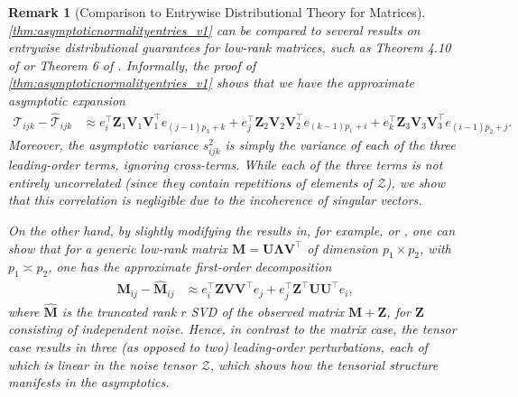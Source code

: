 \documentclass[10pt]{article}
\newcommand{\0}{{\mathbf{0}}}
\newcommand{\1}{{\mathbf{1}}}
\newcommand{\U}{{\mathbf{U}}}
\renewcommand{\citet}{\cite}
\renewcommand{\t}{^{\top}}
\newtheorem{remark}{Remark}
\renewcommand{\hat}{\widehat}
\renewcommand{\hat}{\widehat}
\begin{document}
\begin{remark}[Comparison to Entrywise Distributional  Theory for Matrices]
\cref{thm:asymptoticnormalityentries_v1} can be compared to several results on entrywise distributional guarantees for low-rank matrices, such as Theorem 4.10 of \citet{chen_spectral_2021} or Theorem 6 of \citet{yan_inference_2021}. %
Informally, the proof of \cref{thm:asymptoticnormalityentries_v1} shows that we have the approximate asymptotic expansion
\begin{align*}
    \mathcal{T}_{ijk} - \mathcal{\hat T}_{ijk} &\approx e_{i}^{\top} \mathbf{Z}_{1} \mathbf{V}_{1} \mathbf{V}_{1}^{\top} e_{(j-1) p_{3}+k}+e_{j}^{\top} \mathbf{Z}_{2} \mathbf{V}_{2} \mathbf{V}_{2}^{\top} e_{(k-1) p_{1}+i}+e_{k}^{\top} \mathbf{Z}_{3} \mathbf{V}_{3} \mathbf{V}_{3}^{\top} e_{(i-1) p_{2}+j}.
\end{align*}
Moreover, the asymptotic variance $s^2_{ijk}$ is simply the variance of each of the three leading-order terms, ignoring cross-terms.  While each of the three terms is not entirely uncorrelated (since they contain repetitions of elements of $\mathcal{Z}$), we show that this correlation is negligible due to the incoherence of singular vectors.  

On the other hand, by slightly modifying the results in, for example, \citet{chen_spectral_2021} or \citet{yan_inference_2021}, one can show that for a generic low-rank matrix $\mathbf{M = U \Lambda V\t}$ of dimension $p_1 \times p_2$, with $p_1 \asymp p_2$,  one has the approximate first-order decomposition 
\begin{align*}
    \mathbf{M}_{ij} - \mathbf{\hat M}_{ij} &\approx e_i\t \mathbf{Z} \mathbf{V} \mathbf{V}\t e_j + e_j\t \mathbf{Z}\t \U \U\t e_i,
\end{align*}
where $\mathbf{\hat M}$ is the truncated rank $r$ SVD of the observed matrix $\mathbf{M + Z}$, for $\mathbf{Z}$ consisting of independent noise.    Hence, in contrast to the matrix case, the tensor case results in \emph{three} (as opposed to two) leading-order perturbations, each of which is linear in the noise tensor $\mathcal{Z}$, which shows how the tensorial structure manifests in the asymptotics. 
\end{remark}
\end{document}
